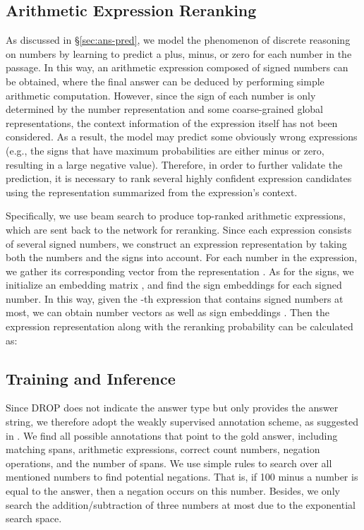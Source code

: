 \documentclass[11pt,a4paper]{article}
\begin{document}
\subsection{Arithmetic Expression Reranking	\label{sec:exp-rerank}}
As discussed in \S\ref{sec:ans-pred}, we model the phenomenon of discrete reasoning on numbers by learning to predict a plus, minus, or zero for each number in the passage.
In this way, an arithmetic expression composed of signed numbers can be obtained, where the final answer can be deduced by performing simple arithmetic computation. 
However, since the sign of each number is only determined by the number representation and some coarse-grained global representations, the context information of the expression itself has not been considered.
As a result, the model may predict some obviously wrong expressions (e.g., the signs that have maximum probabilities are either minus or zero, resulting in a large negative value).
Therefore, in order to further validate the prediction, it is necessary to rank several highly confident expression candidates using the representation summarized from the expression's context.

Specifically, we use beam search to produce top-ranked arithmetic expressions, which are sent back to the network for reranking.
Since each expression consists of several signed numbers, we construct an expression representation by taking both the numbers and the signs into account.
For each number in the expression, we gather its corresponding vector from the representation .
As for the signs, we initialize an embedding matrix , and find the sign embeddings for each signed number. 
In this way, given the -th expression that contains  signed numbers at most, we can obtain number vectors  as well as sign embeddings .
Then the expression representation along with the reranking probability can be calculated as:



\subsection{Training and Inference	\label{sec:train-infer}}
Since DROP does not indicate the answer type but only provides the answer string, we therefore adopt the weakly supervised annotation scheme, as suggested in \citet{berant2013semantic,dua2019drop}. 
We find all possible annotations that point to the gold answer, including matching spans, arithmetic expressions, correct count numbers, negation operations, and the number of spans.
We use simple rules to search over all mentioned numbers to find potential negations. That is, if 100 minus a number is equal to the answer, then a negation occurs on this number.
Besides, we only search the addition/subtraction of three numbers at most due to the exponential search space.
\end{document}
